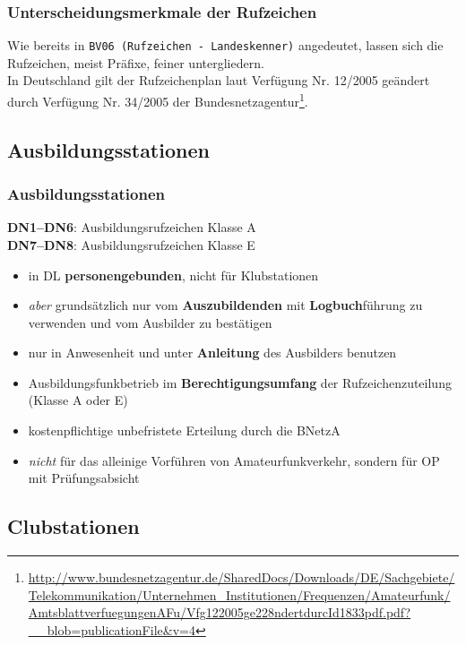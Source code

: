 \begin{frame}
  \frametitle{Unterscheidungsmerkmale der Rufzeichen}

  Wie bereits in \texttt{BV06 (Rufzeichen - Landeskenner)} angedeutet, lassen
  sich die Rufzeichen, meist Präfixe, feiner untergliedern.\\[2em]

  In Deutschland gilt der Rufzeichenplan laut Verfügung Nr. 12/2005 geändert
  durch Verfügung Nr. 34/2005 der
  Bundesnetzagentur\footnote{\ExternalLink\url{http://www.bundesnetzagentur.de/SharedDocs/Downloads/DE/Sachgebiete/Telekommunikation/Unternehmen_Institutionen/Frequenzen/Amateurfunk/AmtsblattverfuegungenAFu/Vfg122005ge228ndertdurcId1833pdf.pdf?__blob=publicationFile&v=4}}.

\end{frame}

\subsection{Ausbildungs\-stationen}

\begin{frame}
  \frametitle{Ausbildungsstationen}

  \textbf{DN1--DN6}: Ausbildungsrufzeichen Klasse A \\
  \textbf{DN7--DN8}: Ausbildungsrufzeichen Klasse E

  \begin{itemize}[<+->]
    \item in DL \textbf{personengebunden}, nicht für Klubstationen
    \item \emph{aber} grundsätzlich nur vom \textbf{Auszubildenden} mit
      \textbf{Logbuch}führung zu verwenden und vom Ausbilder zu bestätigen
    \item nur in Anwesenheit und unter \textbf{Anleitung} des Ausbilders benutzen
    \item Ausbildungsfunkbetrieb im \textbf{Berechtigungsumfang} der
      Rufzeichenzuteilung (Klasse A oder E)
    \item kostenpflichtige unbefristete Erteilung durch die BNetzA
    \item \emph{nicht} für das alleinige Vorführen von Amateurfunkverkehr,
      sondern für OP mit Prüfungsabsicht
  \end{itemize}

\end{frame}

\subsection{Clubstationen}

